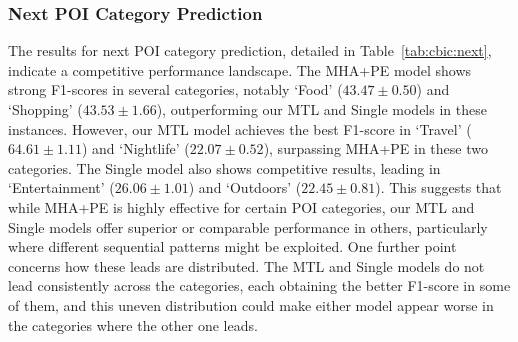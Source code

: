 \subsubsection{Next POI Category Prediction}
The results for next POI category prediction, detailed in Table~\ref{tab:cbic:next}, indicate a competitive performance landscape. The MHA+PE model \cite{zeng2019next} shows strong F1-scores in several categories, notably `Food' ($43.47 \pm 0.50$) and `Shopping' ($43.53 \pm 1.66$), outperforming our MTL and Single models in these instances. However, our MTL model achieves the best F1-score in `Travel' ($64.61 \pm 1.11$) and `Nightlife' ($22.07 \pm 0.52$), surpassing MHA+PE in these two categories. The Single model also shows competitive results, leading in `Entertainment' ($26.06 \pm 1.01$) and `Outdoors' ($22.45 \pm 0.81$). This suggests that while MHA+PE is highly effective for certain POI categories, our MTL and Single models offer superior or comparable performance in others, particularly where different sequential patterns might be exploited. One further point concerns how these leads are distributed. The MTL and Single models do not lead consistently across the categories, each obtaining the better F1-score in some of them, and this uneven distribution could make either model appear worse in the categories where the other one leads.



